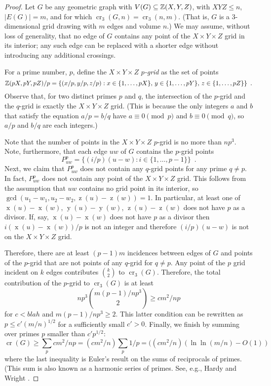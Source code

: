 \documentclass{patmorin}
\DeclareMathOperator{\x}{x}
\DeclareMathOperator{\y}{y}
\DeclareMathOperator{\z}{z}
\DeclareMathOperator{\crs}{cr}
\begin{document}
\begin{proof}
Let $G$ be any geometric graph with $V(G)\subseteq\mathbb{Z}(X,Y,Z)$, with $XYZ\le
n$, $|E(G)|=m$, and for which $\crs_3(G,n)=\crs_3(n,m)$. (That is, $G$
is a 3-dimensional grid drawing with $m$ edges and volume $n$.)  We may
assume, without loss of generality, that no edge of $G$ contains any point
of the $X\times Y\times Z$ grid in its interior; any such edge can be
replaced with a shorter edge without introducing any additional crossings.

For a prime number, $p$, define the $X\times Y\times Z$ \emph{$p$-grid}
as the set of points
\[
  \mathbb{Z}(pX,pY,pZ)/p = \{(x/p,y/p,z/p): x\in\{1,\ldots,pX\},\,
  y\in\{1,\ldots,pY\},\, z\in\{1,\ldots,pZ\}\} \enspace .
\]
Observe that, for two distinct primes $p$ and $q$, the intersection
of the $p$-grid and the $q$-grid is exactly the $X\times Y\times Z$
grid. (This is because the only integers $a$ and $b$ that satisfy the
equation $a/p = b/q$ have $a\equiv 0 \pmod{p}$ and $b\equiv 0\pmod q$,
so $a/p$ and $b/q$ are each integers.)

Note that the number of points in the $X\times Y\times Z$ $p$-grid is
no more than $np^3$.  Note, furthermore, that each edge $uw$ of $G$
contains the $p$-grid points
\[
    P_{uw}^p = \{ (i/p)(u-w) : i\in\{1,\ldots,p-1\} \} \enspace .
\]
Next, we claim that $P_{uw}^p$ does not contain any $q$-grid points for
any prime $q\neq p$.  In fact, $P_{uw}^p$ does not contain any point of
the $X\times Y\times Z$ grid.  This follows from the assumption that $uw$
contains no grid point in its interior, so $\gcd(u_1-w_1, u_2-w_2,
\z(u)-\z(w))=1$.  In particular, at least one of $\x(u)-\x(w)$,
$\y(u)-\y(w)$, $\z(u)-\z(w)$ does not have $p$ as a divisor.  If, say,
$\x(u)-\x(w)$ does not have $p$ as a divisor then $i(\x(u)-\x(w))/p$
is not an integer and therefore $(i/p)(u-w)$ is not on the $X\times
Y\times Z$ grid.

Therefore, there are at least $(p-1)m$ incidences between edges of $G$ and
points of the $p$-grid that are not points of any $q$-grid for $q\neq p$.
Any point of the $p$ grid incident on $k$ edges contributes $\binom{k}{2}$
to $\crs_3(G)$.  Therefore, the total contribution of the $p$-grid to
$\crs_3(G)$ is at least
\[
    np^3\binom{m(p-1)/np^3}{2} \ge cm^2/np
\]
for $c<blah$ and $m(p-1)/np^3 \ge 2$.  This latter condition can be
rewritten as $p \le c'(m/n)^{1/2}$ for a sufficiently small $c'>0$.
Finally, we finish by summing over primes $p$ smaller than $c'p^{1/2}$:
\[
   \crs(G) \ge \sum_{p} cm^2/np = (cm^2/n) \sum_{p} 1/p = ((cm^2/n)(\ln\ln(m/n)-O(1))
\]
where the last inequality is Euler's result on the sums of reciprocals
of primes. (This sum is also known as a harmonic series of primes.  See,
e.g., Hardy and Wright \cite[Section~22.7]{hw79}.
\end{proof}
\end{document}
